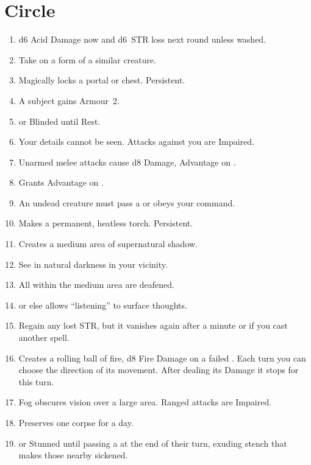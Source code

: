 \documentclass[itdr]{subfiles}
\begin{document}
\section{ Circle}
\begin{enumerate}
	\item {} d6 Acid Damage now and d6~STR loss next round unless washed.
	\item {} Take on a form of a similar creature.
	\item {} Magically locks a portal or chest. Persistent.
	\item {} A subject gains Armour~2.
	\item {}  or Blinded until Rest.
	\item {} Your details cannot be seen. Attacks against you are Impaired.
	\item {} Unarmed melee attacks cause d8 Damage, Advantage on .
	\item {} Grants Advantage on .
	\item {} An undead creature must pass a  or obeys your command.
	\item {} Makes a permanent, heatless torch. Persistent.
	\item {} Creates a medium area of supernatural shadow.
	\item {} See in natural darkness in your vicinity.
	\item {} All within the medium area are deafened.
	\item {}  or else allows ``listening'' to surface thoughts.
	\item {} Regain any lost STR, but it vanishes again after a minute or if you cast another spell.
	\item {} Creates a rolling ball of fire, d8 Fire Damage on a failed . Each turn you can choose the direction of its movement. After dealing its Damage it stops for this turn.
	\item {} Fog obscures vision over a large area. Ranged attacks are Impaired.
	\item {} Preserves one corpse for a day.
	\item {}  or Stunned until passing a   at the end of their turn, exuding stench that makes those nearby sickened.

\end{enumerate}
\end{document}
